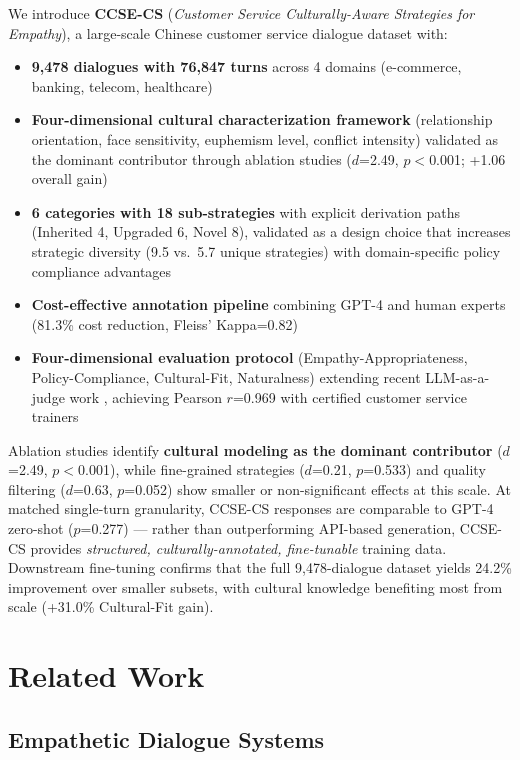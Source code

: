 \documentclass[11pt]{article}
\begin{document}
We introduce \textbf{CCSE-CS} (\textit{Customer Service Culturally-Aware Strategies for Empathy}), a large-scale Chinese customer service dialogue dataset with:
\begin{itemize}
  \item \textbf{9,478 dialogues with 76,847 turns} across 4 domains (e-commerce, banking, telecom, healthcare)
  \item \textbf{Four-dimensional cultural characterization framework} (relationship orientation, face sensitivity, euphemism level, conflict intensity) validated as the dominant contributor through ablation studies ($d$=2.49, $p<$0.001; +1.06 overall gain)
  \item \textbf{6 categories with 18 sub-strategies} with explicit derivation paths (Inherited 4, Upgraded 6, Novel 8), validated as a design choice that increases strategic diversity (9.5 vs.\ 5.7 unique strategies) with domain-specific policy compliance advantages
  \item \textbf{Cost-effective annotation pipeline} combining GPT-4 and human experts (81.3\% cost reduction, Fleiss' Kappa=0.82)
  \item \textbf{Four-dimensional evaluation protocol} (Empathy-Appropriateness, Policy-Compliance, Cultural-Fit, Naturalness) extending recent LLM-as-a-judge work \cite{nature_llm_empathy_2025}, achieving Pearson $r$=0.969 with certified customer service trainers
\end{itemize}

Ablation studies identify \textbf{cultural modeling as the dominant contributor} ($d$=2.49, $p<$0.001), while fine-grained strategies ($d$=0.21, $p$=0.533) and quality filtering ($d$=0.63, $p$=0.052) show smaller or non-significant effects at this scale. At matched single-turn granularity, CCSE-CS responses are comparable to GPT-4 zero-shot ($p$=0.277) --- rather than outperforming API-based generation, CCSE-CS provides \textit{structured, culturally-annotated, fine-tunable} training data. Downstream fine-tuning confirms that the full 9,478-dialogue dataset yields 24.2\% improvement over smaller subsets, with cultural knowledge benefiting most from scale (+31.0\% Cultural-Fit gain).

\section{Related Work}

\subsection{Empathetic Dialogue Systems}
\end{document}
